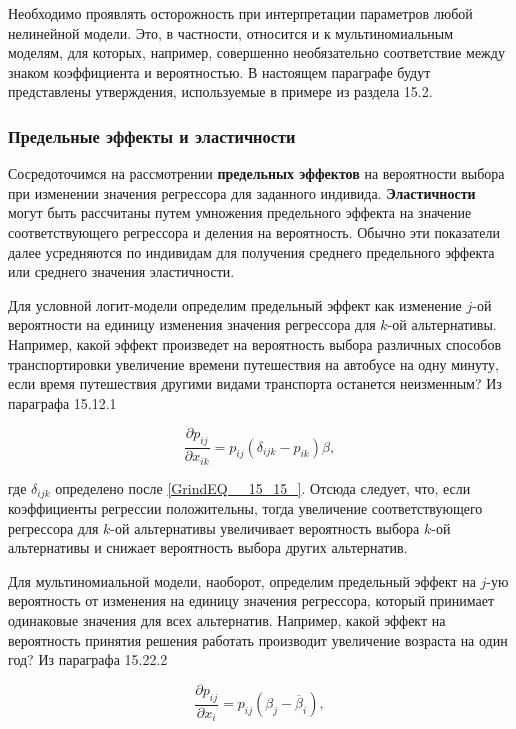 Необходимо проявлять осторожность при интерпретации параметров любой нелинейной модели. Это, в частности, относится и к мультиномиальным моделям, для которых, например, совершенно необязательно соответствие между знаком коэффициента и вероятностью. В настоящем параграфе будут представлены утверждения, используемые в примере из раздела 15.2.

\subsubsection*{Предельные эффекты и эластичности}

Сосредоточимся на рассмотрении \textbf{предельных эффектов} на вероятности выбора при изменении значения регрессора для заданного индивида. \textbf{Эластичности } могут быть рассчитаны путем умножения предельного эффекта на значение соответствующего регрессора и деления на вероятность. Обычно эти показатели далее усредняются по индивидам для получения среднего предельного эффекта или среднего значения эластичности.

Для условной логит-модели определим предельный эффект как изменение $j$-ой вероятности на единицу изменения значения регрессора для $k$-ой альтернативы. Например, какой эффект произведет на вероятность выбора различных способов транспортировки увеличение времени путешествия на автобусе на одну минуту, если время путешествия другими видами транспорта останется неизменным? Из параграфа 15.12.1

\begin{equation} \label{GrindEQ__15_18_} \frac{\partial p_{ij}}{\partial x_{ik}}=p_{ij}\left({\delta }_{ijk}-p_{ik}\right)\beta , \end{equation} 

где ${\delta }_{ijk}$ определено после \eqref{GrindEQ__15_15_}. Отсюда следует, что, если коэффициенты регрессии положительны, тогда увеличение соответствующего  регрессора для $k$-ой альтернативы увеличивает вероятность выбора $k$-ой альтернативы и снижает вероятность выбора других альтернатив.

Для мультиномиальной модели, наоборот, определим предельный эффект на $j$-ую вероятность от изменения на единицу значения регрессора, который принимает одинаковые значения для всех альтернатив. Например, какой эффект на вероятность принятия решения работать производит увеличение возраста на один год? Из параграфа 15.22.2

\begin{equation} \label{GrindEQ__15_19_} \frac{\partial p_{ij}}{\partial x_i}=p_{ij}\left({\beta }_j-{\overline{\beta }}_i\right), \end{equation} 

